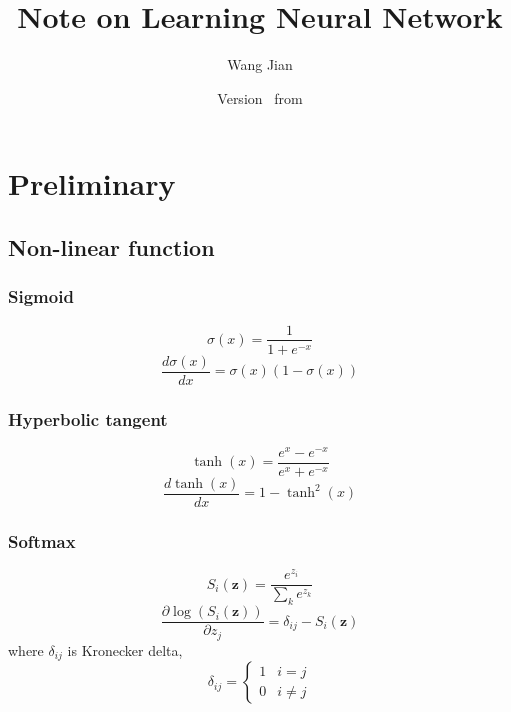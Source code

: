 \documentclass[12pt]{article}
\title{Note on Learning Neural Network}
\author{Wang Jian}
\date{Version \vhCurrentVersion\ from \vhCurrentDate}
\numberwithin{equation}{section}
\begin{document}
\maketitle
\begin{versionhistory}
\end{versionhistory}

\tableofcontents
\newpage

\section{Preliminary}
\subsection{Non-linear function}
\subsubsection{Sigmoid}
\begin{equation}
    \sigma(x) = \frac{1}{1 + e^{-x}}
\end{equation}
\begin{equation} \label{eq:sigmoid_diff}
    \frac{d\sigma(x)}{dx} = \sigma(x)(1 - \sigma(x)) 
\end{equation}

\subsubsection{Hyperbolic tangent}
\begin{equation}
    \tanh(x) = \frac{e^x-e^{-x}}{e^x + e^{-x}}
\end{equation}
\begin{equation}
    \frac{d\tanh(x)}{dx} = 1 - \tanh^2(x)
\end{equation}

\subsubsection{Softmax}
\begin{equation} \label{eq:softmax}
    S_i(\bm{z}) = \frac{e^{z_i}}{\sum_k{e^{z_k}} }
\end{equation}
\begin{equation} \label{eq:softmax_diff}
    \frac{\partial\log(S_i(\bm{z}))}{\partial z_j} = \delta_{ij} - S_i({\bm{z}}) 
\end{equation}
where $\delta_{ij}$ is  Kronecker delta, 
$$
    \delta_{ij} = \left\{\begin{array}{rl}
                                    1 & i = j \\
                                    0 & i \neq j 
                                \end{array} \right.
$$
\end{document}
